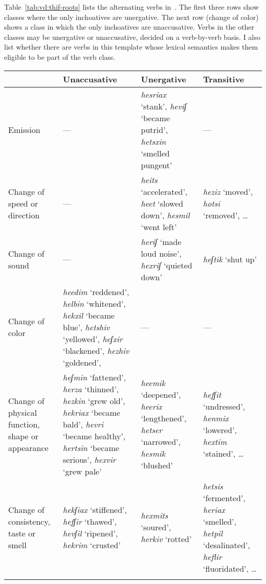 \begin{exe}
\begin{xlist}
\begin{xlist}
\begin{exe}
\begin{exe}
\begin{xlist}
\begin{exe}
\begin{xlist}
\begin{exe}
\begin{xlist}
\begin{xlist}
\hspace*{-0.78136pt}Table~\ref{tab:vd:thif-roots} lists the alternating verbs in~{\thif}. The first three rows show classes where the only inchoatives are unergative. The next row (change of color) shows a class in which the only inchoatives are unaccusative. Verbs in the other classes may be unergative or unaccusative, decided on a verb-by-verb basis. I also list whether there are  verbs in this template whose lexical semantics makes them eligible to be part of the verb class.

\begin{table} \small
	\begin{tabularx}{\textwidth}{L{2cm}L{3.5cm}L{3cm}L{2.5cm}}
 \lsptoprule
		&	Unaccusative &  Unergative & Transitive\\\midrule
	Emission & --- & \emph{hesriax} `stank', \emph{heviʃ} `became putrid', \emph{hetsxin} `smelled pungent'\footnotemark & --- \\
	
	Change of speed or direction & --- & \emph{heits} `accelerated', \emph{heet} `slowed down', \emph{hesmil} `went left' & \emph{heziz} `moved', \emph{hotsi} `removed', \dots \\
	
	Change of sound & --- & \emph{heriʃ} `made loud noise', \emph{hexriʃ} `quieted down' & \emph{heʃtik} `shut up' \\\tablevspace
	
	Change of color & \emph{heedim} `reddened', \emph{helbin} `whitened', \emph{hekxil} `became blue', \emph{he{ts}hiv} `yellowed', \emph{heʃxir} `blackened', \emph{hezhiv} `goldened', 
				& --- & --- \\\tablevspace
		
	Change of physical function, shape or appearance & \emph{heʃmin} `fattened', \emph{herza} `thinned', \emph{hezkin} `grew old', \emph{hekriax} `became bald', \emph{hevri} `became healthy', \emph{her{ts}in} `became serious', \emph{hexvir} `grew pale' &
		\emph{heemik} `deepened', \emph{heerix} `lengthened', \emph{he{ts}er} `narrowed', \emph{hesmik} `blushed' & \emph{hefʃit} `undressed', \emph{henmix} `lowered', \emph{hextim} `stained', \dots \\

	Change of consistency, taste or smell & \emph{hekʃiax} `stiffened', \emph{hefʃir} `thawed', \emph{hevʃil} `ripened', \emph{hekrim} `crusted'
		& \emph{hexmits} `soured', \emph{herkiv} `rotted'
		& \emph{hetsis} `fermented', \emph{heriax} `smelled', \emph{hetpil} `desalinated', \emph{heflir} `fluoridated', \dots \\\tablevspace
		

\end{tabularx}
\end{table}
\end{xlist}
\end{xlist}
\end{exe}
\end{xlist}
\end{exe}
\end{xlist}
\end{exe}
\end{exe}
\end{xlist}
\end{xlist}
\end{exe}
